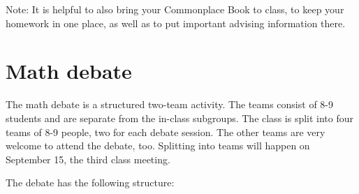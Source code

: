 \documentclass[oneside,11pt]{amsart}
\begin{document}
\medskip\noindent
Note: It is helpful to also bring your Commonplace Book to class, 
to keep your homework in one place, as well as to put important
advising information there.


\section{Math debate}

The math debate is a structured two-team activity.
The teams consist of 8-9 students and are separate from the 
in-class subgroups. The class is split into four teams of 8-9 people,
two for each debate session.
The other teams are very welcome to attend the debate, too.
Splitting into teams will happen on September 15, the third class meeting.

The debate has the following structure:
\end{document}
